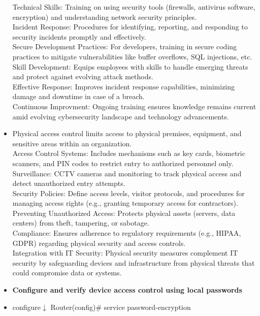 \documentclass{article}
\begin{document}
\begin{itemize}
	Technical Skills: Training on using security tools (firewalls, antivirus software, encryption) and understanding network security principles.\\
	Incident Response: Procedures for identifying, reporting, and responding to security incidents promptly and effectively.\\
	Secure Development Practices: For developers, training in secure coding practices to mitigate vulnerabilities like buffer overflows, SQL injections, etc.\\
	Skill Development: Equips employees with skills to handle emerging threats and protect against evolving attack methods.\\
	Effective Response: Improves incident response capabilities, minimizing damage and downtime in case of a breach.\\
	Continuous Improvment: Ongoing training ensures knowledge remains current amid evolving cybersecurity landscape and technology advancements.
	\item[] Physical access control limits access to physical premises, equipment, and sensitive areas within an organization.\\
	Access Control Systems: Includes mechanisms such as key cards, biometric scanners, and PIN codes to restrict entry to authorized personnel only.\\
	Surveillance: CCTV cameras and monitoring to track physical access and detect unauthorized entry attempts.\\
	Security Policies: Define access levels, visitor protocols, and procedures for managing access rights (e.g., granting temporary access for contractors).\\
	Preventing Unauthorized Access: Protects physical assets (servers, data centers) from theft, tampering, or sabotage.\\
	Compliance: Ensures adherence to regulatory requirements (e.g., HIPAA, GDPR) regarding physical security and access controls.\\
	Integration with IT Security: Physical security measures complement IT security by safeguarding devices and infrastructure from physical threats that could compromise data or systems.
  
  \item \textbf{Configure and verify device access control using local passwords}
  	\item[] configure$\downarrow$
  		Router(config)\# service password-encryption\\
  		

\end{itemize}
\end{document}
